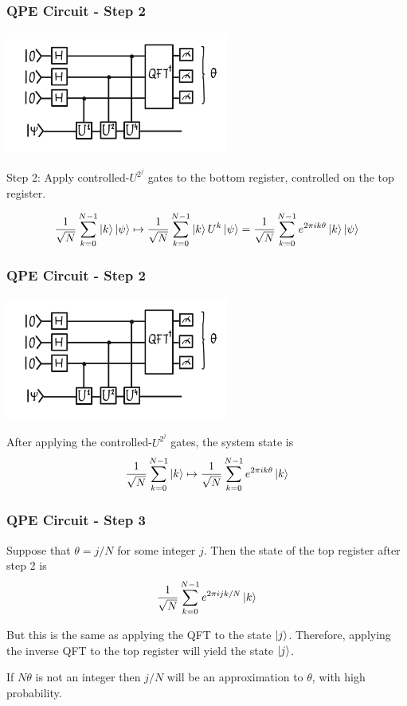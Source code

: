 \documentclass{beamer}
\begin{document}
\begin{frame}
    \frametitle{QPE Circuit - Step 2}
    \includegraphics[height=4cm]{qpe.png}

    Step 2: Apply controlled-$U^{2^j}$ gates to the bottom register, 
    controlled on the top register.
  
    $$\frac{1}{\sqrt{N}} \sum_{k=0}^{N-1} \left| k \right\rangle \left| \psi \right\rangle \mapsto
    \frac{1}{\sqrt{N}} \sum_{k=0}^{N-1} \left| k \right\rangle U^{k} \left| \psi \right\rangle
    = \frac{1}{\sqrt{N}} \sum_{k=0}^{N-1} e^{2\pi i k \theta} \left| k \right\rangle \left| \psi \right\rangle
    $$
\end{frame}

\begin{frame}
    \frametitle{QPE Circuit - Step 2}
    \includegraphics[height=4cm]{qpe.png}

    After applying the controlled-$U^{2^j}$ gates, the system state is
    $$\frac1{\sqrt{N}} \sum_{k=0}^{N-1} \left| k \right\rangle \mapsto 
    \frac1{\sqrt{N}} \sum_{k=0}^{N-1} e^{2\pi ik\theta} \left| k \right\rangle$$
\end{frame}

\begin{frame}
    \frametitle{QPE Circuit - Step 3}

    Suppose that $\theta = j / N$ for some integer $j$.
    Then the state of the top register after step 2 is
    $$\frac1{\sqrt{N}} \sum_{k=0}^{N-1} e^{2\pi ijk/N} \left| k \right\rangle$$

    But this is the same as applying the QFT to the state $\left| j \right\rangle$.
    Therefore, applying the inverse QFT to the top register will yield 
    the state $\left| j \right\rangle$.
 
    \vspace{0.25cm}
 
    If $N\theta$ is not an integer then $j/N$
    will be an approximation to $\theta$, with high probability.
\end{frame}
\end{document}
